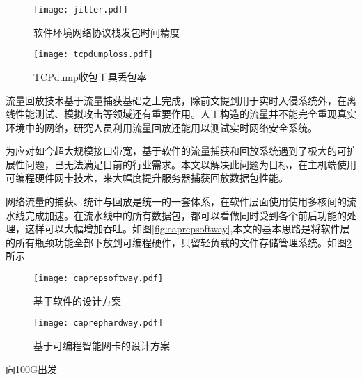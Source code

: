 \begin{figure}[htbp]
	\centering
	\begin{minipage}[t]{0.48\textwidth}
		\centering
		\texttt{[image: jitter.pdf]}
		\caption{软件环境网络协议栈发包时间精度} \label{fig:jitter}
	\end{minipage}
	\begin{minipage}[t]{0.48\textwidth}
		\centering
		\texttt{[image: tcpdumploss.pdf]}
		\caption{TCPdump收包工具丢包率} \label{fig:tcpdumploss}
	\end{minipage}
\end{figure}

流量回放技术基于流量捕获基础之上完成，除前文提到用于实时入侵系统外，在离线性能测试、模拟攻击等领域还有重要作用。人工构造的流量并不能完全重现真实环境中的网络，研究人员利用流量回放还能用以测试实时网络安全系统。

为应对如今超大规模接口带宽，基于软件的流量捕获和回放系统遇到了极大的可扩展性问题，已无法满足目前的行业需求。本文以解决此问题为目标，在主机端使用可编程硬件网卡技术，来大幅度提升服务器捕获回放数据包性能。




网络流量的捕获、统计与回放是统一的一套体系，在软件层面使用使用多核间的流水线完成加速。在流水线中的所有数据包，都可以看做同时受到各个前后功能的处理，这样可以大幅增加吞吐。如图\ref{fig:caprepsoftway},本文的基本思路是将软件层的所有瓶颈功能全部下放到可编程硬件，只留轻负载的文件存储管理系统。如图\ref{fig:caprephardway}所示

\begin{figure}[htbp]
	\centering
	\begin{minipage}[t]{0.48\textwidth}
		\centering
		\texttt{[image: caprepsoftway.pdf]}
		\caption{基于软件的设计方案} \label{fig:caprepsoftway}
	\end{minipage}
	\begin{minipage}[t]{0.48\textwidth}
		\centering
		\texttt{[image: caprephardway.pdf]}
		\caption{基于可编程智能网卡的设计方案} \label{fig:caprephardway}
	\end{minipage}
\end{figure}


向100G出发




